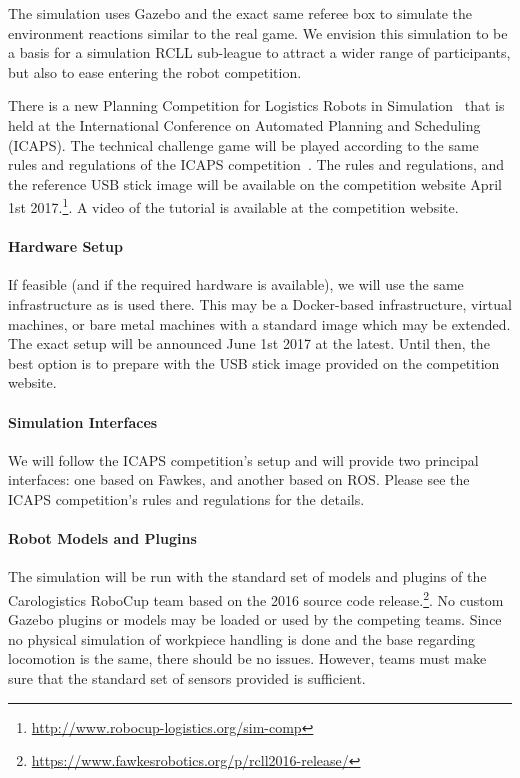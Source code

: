 \documentclass[12pt,twoside]{article}
\begin{document}
The simulation uses Gazebo and the exact same referee box to simulate
the environment reactions similar to the real game. We envision this
simulation to be a basis for a simulation RCLL sub-league to attract a
wider range of participants, but also to ease entering the robot
competition.

There is a new Planning Competition for Logistics Robots in
Simulation~\cite{LogRobComp2016} that is held at the International
Conference on Automated Planning and Scheduling (ICAPS). The technical
challenge game will be played according to the same rules and
regulations of the ICAPS competition~\cite{LogRobComp-Rules-2017}. The
rules and regulations, and the reference USB stick image will be
available on the competition website April 1st
2017.\footnote{\url{http://www.robocup-logistics.org/sim-comp}}. A
video of the tutorial is available at the competition website.

\vspace{-2ex}\paragraph{Hardware Setup}
%
If feasible (and if the required hardware is available), we will use
the same infrastructure as is used there. This may be a Docker-based
infrastructure, virtual machines, or bare metal machines with a
standard image which may be extended. The exact setup will be
announced June 1st 2017 at the latest. Until then, the best option is
to prepare with the USB stick image provided on the competition
website.

\vspace{-2ex}\paragraph{Simulation Interfaces}
%
We will follow the ICAPS competition's setup and will provide two
principal interfaces: one based on Fawkes, and another based on
ROS. Please see the ICAPS competition's rules and regulations for the
details.

\vspace{-2ex}\paragraph{Robot Models and Plugins}
%
The simulation will be run with the standard set of models and plugins
of the Carologistics RoboCup team based on the 2016 source code
release.\footnote{\url{https://www.fawkesrobotics.org/p/rcll2016-release/}}. No
custom Gazebo plugins or models may be loaded or used by the competing
teams. Since no physical simulation of workpiece handling is done and
the base regarding locomotion is the same, there should be no
issues. However, teams must make sure that the standard set of sensors
provided is sufficient.
\end{document}
